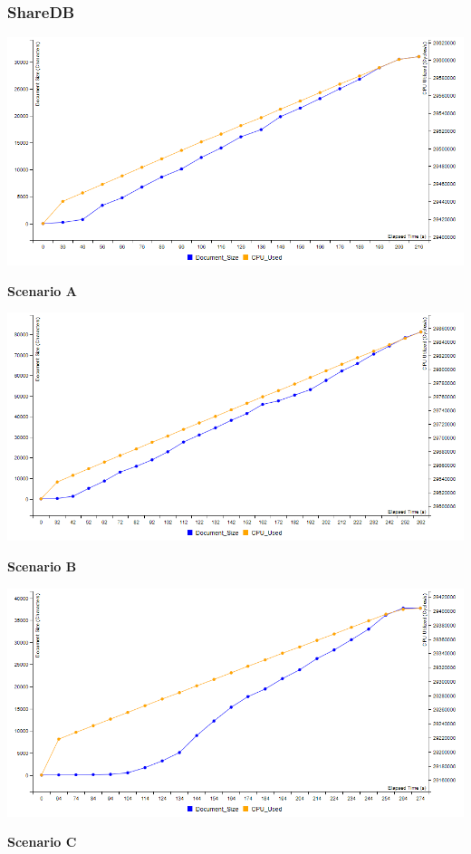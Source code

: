 \documentclass[12pt]{article}
\begin{document}
  \subsubsection{ShareDB}
  \begin{center}
    \includegraphics[scale=0.48]{sharedb_doc_size_S1.png}

    \textbf{Scenario A}
    
    \includegraphics[scale=0.48]{sharedb_doc_size_S2.png}
    
    \textbf{Scenario B}
    
    \includegraphics[scale=0.48]{sharedb_doc_size_S3.png}
    
    \textbf{Scenario C}
  \end{center}
\end{document}
